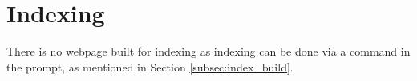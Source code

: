 \section{Indexing}
There is no webpage built for indexing as indexing can be done via a command in the prompt, as mentioned in Section \ref{subsec:index_build}.